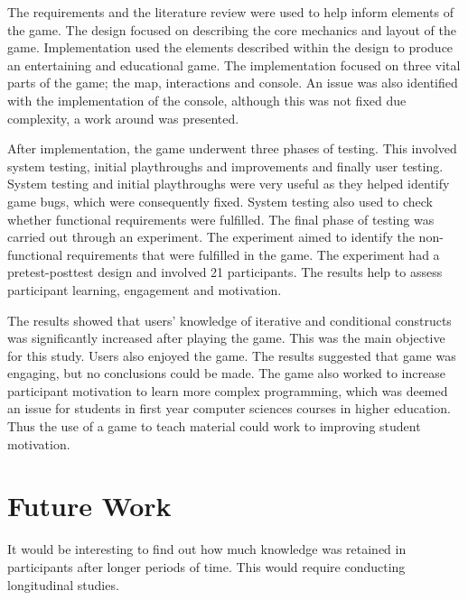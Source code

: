 \documentclass[a4paper,11.5pt]{report}
\numberwithin{figure}{section}
\numberwithin{table}{section}
\numberwithin{equation}{section}
\numberwithin{equation}{section}
\newcommand\blankpage{%
    \null
    \thispagestyle{empty}%
    \addtocounter{page}{-1}%
    \newpage}
\begin{document}
The requirements and the literature review were used to help inform elements of the game. The design focused on describing the core mechanics and layout of the game. Implementation used the elements described within the design to produce an entertaining and educational game. The implementation focused on three vital parts of the game; the map, interactions and console. An issue was also identified with the implementation of the console, although this was not fixed due complexity, a work around was presented.

After implementation, the game underwent three phases of testing. This involved system testing, initial playthroughs and improvements and finally user testing. System testing and initial playthroughs were very useful as they helped identify game bugs, which were consequently fixed. System testing also used to check whether functional requirements were fulfilled.  The final phase of testing was carried out through an experiment. The experiment aimed to identify the non-functional requirements that were fulfilled in the game. The experiment had a pretest-posttest design and involved 21 participants. The results help to assess participant learning, engagement and motivation. 

The results showed that users' knowledge of iterative and conditional constructs was significantly increased after playing the game. This was the main objective for this study. Users also enjoyed the game. The results suggested that game was engaging, but no conclusions could be made. The game also worked to increase participant motivation to learn more complex programming, which was deemed an issue for students in first year computer sciences courses in higher education. Thus the use of a game to teach material could work to improving student motivation.












\afterpage{\blankpage}



\chapter{Future Work}

It would be interesting to find out how much knowledge was retained in participants after longer periods of time. This would require conducting longitudinal studies. 
\end{document}
